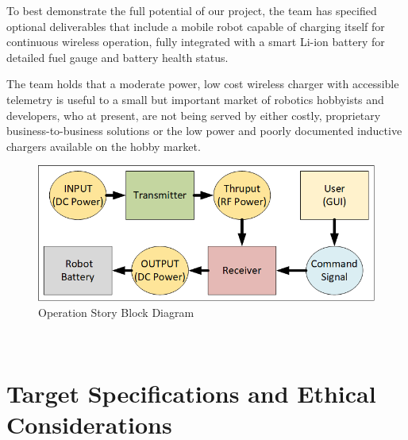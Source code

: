 \documentclass[12pt]{article}
\begin{document}
To best demonstrate the full potential of our project, the team has specified optional deliverables that include a mobile robot capable of charging itself for continuous wireless operation, fully integrated with a smart Li-ion battery for detailed fuel gauge and battery health status.\\ \indent %

The team holds that a moderate power, low cost wireless charger with accessible telemetry is useful to a small but important market of robotics hobbyists and developers, who at present, are not being served by either costly, proprietary business-to-business solutions or the low power and poorly documented inductive chargers available on the hobby market.\\
\hfill 
\begin{figure}[h!]
\centering
\includegraphics[width=0.84\linewidth]{black_box_power}
\caption{Operation Story Block Diagram}
\end{figure}
\hfill \\
\pagebreak
\section{Target Specifications and Ethical Considerations}
\end{document}
